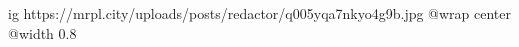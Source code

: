  
 
 
 
 

\ifcmt
  ig https://mrpl.city/uploads/posts/redactor/q005yqa7nkyo4g9b.jpg
  @wrap center
  @width 0.8
\fi
